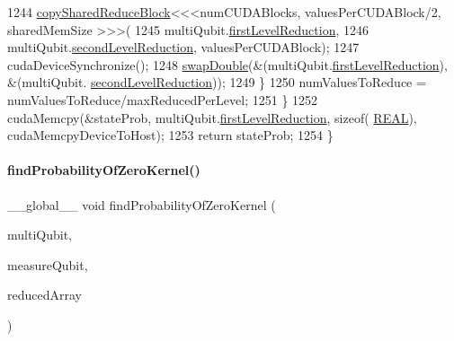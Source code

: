\begin{DoxyCode}
1244             \mbox{\hyperlink{QuEST__env__localGPU_8cu_a250e9d66ad94ed2682e76a3c7502c8e1}{copySharedReduceBlock}}<<<numCUDABlocks, valuesPerCUDABlock/2, sharedMemSize
      >>>(
1245                     multiQubit.\mbox{\hyperlink{structMultiQubit_a4e0088b41adab0a40b7a31e528ed42b5}{firstLevelReduction}}, 
1246                     multiQubit.\mbox{\hyperlink{structMultiQubit_a3e859cefa146ec7b30464ab3d897930b}{secondLevelReduction}}, valuesPerCUDABlock); 
1247             cudaDeviceSynchronize();    
1248             \mbox{\hyperlink{QuEST__env__localGPU_8cu_aac328dfe6dd7cceec36a83d989b180b6}{swapDouble}}(&(multiQubit.\mbox{\hyperlink{structMultiQubit_a4e0088b41adab0a40b7a31e528ed42b5}{firstLevelReduction}}), &(multiQubit.
      \mbox{\hyperlink{structMultiQubit_a3e859cefa146ec7b30464ab3d897930b}{secondLevelReduction}}));
1249         \}
1250         numValuesToReduce = numValuesToReduce/maxReducedPerLevel;
1251     \}
1252     cudaMemcpy(&stateProb, multiQubit.\mbox{\hyperlink{structMultiQubit_a4e0088b41adab0a40b7a31e528ed42b5}{firstLevelReduction}}, \textcolor{keyword}{sizeof}(
      \mbox{\hyperlink{QuEST__precision_8h_a4b654506f18b8bfd61ad2a29a7e38c25}{REAL}}), cudaMemcpyDeviceToHost);
1253     \textcolor{keywordflow}{return} stateProb;
1254 \}
\end{DoxyCode}
\mbox{\label{QuEST__env__localGPU_8cu_aa9d9643aec790baf66e6322e591ebfd6}} 
\paragraph{\texorpdfstring{find\+Probability\+Of\+Zero\+Kernel()}{findProbabilityOfZeroKernel()}}
{\footnotesize\ttfamily \+\_\+\+\_\+global\+\_\+\+\_\+ void find\+Probability\+Of\+Zero\+Kernel (\begin{DoxyParamCaption}\item[{\mbox{\hyperlink{structMultiQubit}{Multi\+Qubit}}}]{multi\+Qubit,  }\item[{const int}]{measure\+Qubit,  }\item[{\mbox{\hyperlink{QuEST__precision_8h_a4b654506f18b8bfd61ad2a29a7e38c25}{R\+E\+AL}} $\ast$}]{reduced\+Array }\end{DoxyParamCaption})}



